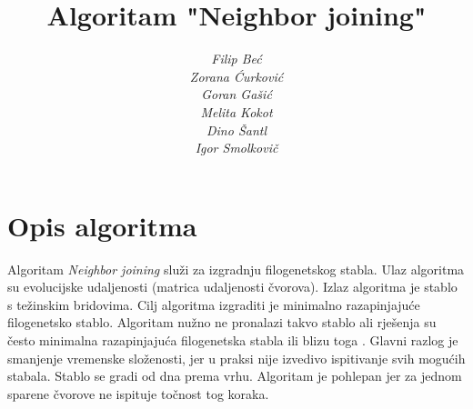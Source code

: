\documentclass[times, utf8, seminar, numeric]{fer}
\begin{document}
\nocite{saitou}\nocite{phylpro}\nocite{wiki}\nocite{mbt}

\title{Algoritam "Neighbor joining"}

\author{\itshape{Filip Beć}\\
				 \itshape{Zorana Ćurković}\\
				 \itshape{Goran Gašić}\\
				 \itshape{Melita Kokot}\\
				 \itshape{Dino Šantl}\\
				 \itshape{Igor Smolkovič}
				 }


\maketitle

\tableofcontents

\chapter{Opis algoritma}

Algoritam \emph{Neighbor joining} služi za izgradnju filogenetskog stabla. Ulaz algoritma su evolucijske udaljenosti (matrica udaljenosti čvorova). Izlaz algoritma je stablo s težinskim bridovima. Cilj algoritma izgraditi je minimalno razapinjajuće filogenetsko stablo. Algoritam nužno ne pronalazi takvo stablo ali rješenja su često minimalna razapinjajuća filogenetska stabla ili blizu toga \cite{saitou}. Glavni razlog je smanjenje vremenske složenosti, jer u praksi nije izvedivo ispitivanje svih mogućih stabala. Stablo se gradi od dna prema vrhu. Algoritam je pohlepan jer za jednom sparene čvorove ne ispituje točnost tog koraka.
\end{document}
